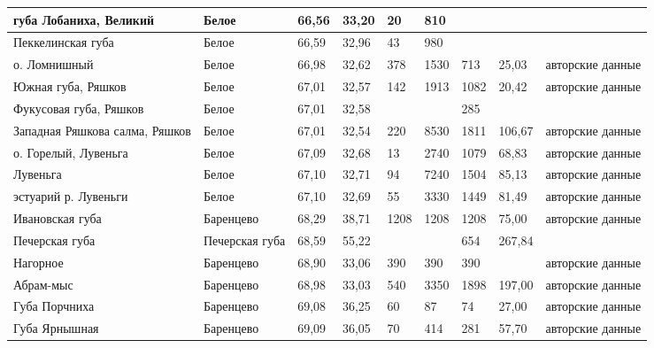 \begin{footnotesize}
\begin{center}
\begin{longtable}{|p{3cm}p{2cm}|*{2}{p{1cm}}|*{3}{p{0.9cm}}|p{0.9cm}|p{2cm}|}
губа Лобаниха, Великий              & Белое            & 66,56  & 33,20   & 20   & 810  &       &        & \cite{Semenova_1974}	\\ \hline
Пеккелинская губа                   & Белое            & 66,59  & 32,96   & 43   & 980  &       &        & \cite{Semenova_1974}	\\ \hline
о. Ломнишный                        & Белое            & 66,98  & 32,62   & 378  & 1530 & 713   & 25,03  & авторские данные	\\ \hline
Южная губа, Ряшков                  & Белое            & 67,01  & 32,57   & 142  & 1913 & 1082  & 20,42  & авторские данные	\\ \hline
Фукусовая губа, Ряшков              & Белое            & 67,01  & 32,58   &      &      & 285   &        & \cite{Khaitov_et_al_2007}	\\ \hline
Западная Ряшкова салма, Ряшков      & Белое            & 67,01  & 32,54   & 220  & 8530 & 1811  & 106,67 & авторские данные	\\ \hline
о. Горелый, Лувеньга                & Белое            & 67,09  & 32,68   & 13   & 2740 & 1079  & 68,83  & авторские данные	\\ \hline
Лувеньга                            & Белое            & 67,10  & 32,71   & 94   & 7240 & 1504  & 85,13  & авторские данные	\\ \hline
эстуарий р. Лувеньги                & Белое            & 67,10  & 32,69   & 55   & 3330 & 1449  & 81,49  & авторские данные	\\ \hline
Ивановская губа                     & Баренцево        & 68,29  & 38,71   & 1208 & 1208 & 1208  & 75,00  & авторские данные	\\ \hline
Печерская губа                      & Печерская губа   & 68,59  & 55,22   &      &      & 654   & 267,84 & \cite{Denisenko_et_al_2003}	\\ \hline
Нагорное                            & Баренцево        & 68,90  & 33,06   & 390  & 390  & 390   &        & авторские данные	\\ \cline{1-8}
Абрам-мыс                           & Баренцево        & 68,98  & 33,03   & 540  & 3350 & 1898  & 197,00 & авторские данные	\\ \hline
Губа Порчниха                       & Баренцево        & 69,08  & 36,25   & 60   & 87   & 74    & 27,00  & авторские данные	\\ \hline
Губа Ярнышная                       & Баренцево        & 69,09  & 36,05   & 70   & 414  & 281   & 57,70  & авторские данные	\\ \hline

\end{longtable}
\end{center}
\end{footnotesize}
